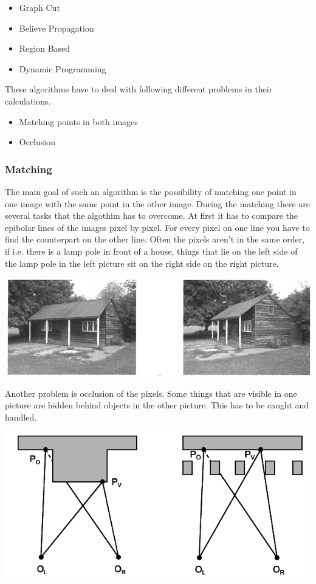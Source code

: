 \documentclass[12pt,draft,a4paper]{article}
\begin{document}
\begin{itemize}
\item Graph Cut
\item Believe Propagation
\item Region Based
\item Dynamic Programming
\end{itemize}

These algorithms have to deal with following different problems in their
calculations.

\begin{itemize}
    \item Matching points in both images
    \item Occlusion
\end{itemize}

\subsubsection{Matching}
The main goal of such an algorithm is the possibility of matching one
point in one image with the same point in the other image. During the
matching there are several tasks that the algothim has to overcome. At
first it has to compare the epibolar lines of the images pixel by
pixel. For every pixel on one line you have to find the counterpart on
the other line. Often the pixels aren't in the same order, if
i.e. there is a lamp pole in front of a house, things that lie on
the left side of the lamp pole in the left picture sit on the right
side on the right picture.

\includegraphics{matching_problems_direction}  

Another problem is occlusion of the pixels. Some things that are
visible in one picture are hidden behind objects in the other
picture. This has to be caught and handled.

\includegraphics{matching_problems_occlusion}
\end{document}
